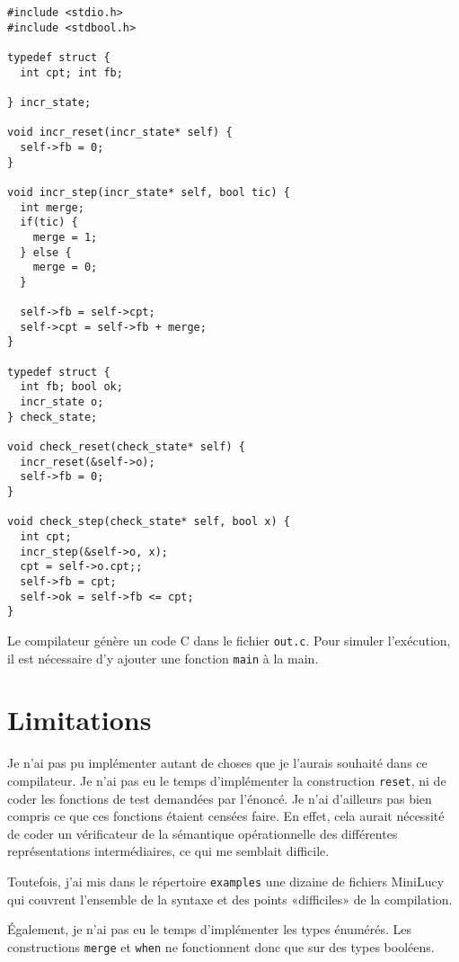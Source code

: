 \documentclass{article}
\begin{document}
\begin{verbatim}
#include <stdio.h>
#include <stdbool.h>

typedef struct {
  int cpt; int fb;

} incr_state;

void incr_reset(incr_state* self) {
  self->fb = 0;
}

void incr_step(incr_state* self, bool tic) {
  int merge;
  if(tic) {
    merge = 1;
  } else {
    merge = 0;
  }

  self->fb = self->cpt;
  self->cpt = self->fb + merge;
}

typedef struct {
  int fb; bool ok;
  incr_state o;
} check_state;

void check_reset(check_state* self) {
  incr_reset(&self->o);
  self->fb = 0;
}

void check_step(check_state* self, bool x) {
  int cpt;
  incr_step(&self->o, x);
  cpt = self->o.cpt;;
  self->fb = cpt;
  self->ok = self->fb <= cpt;
}
\end{verbatim}

Le compilateur génère un code C dans le fichier \verb/out.c/. Pour simuler
l'exécution, il est nécessaire d'y ajouter une fonction \verb/main/ à la main.

\section{Limitations}

Je n'ai pas pu implémenter autant de choses que je l'aurais souhaité dans ce
compilateur. Je n'ai pas eu le temps d'implémenter la construction \verb/reset/,
ni de coder les fonctions de test demandées par l'énoncé. Je n'ai d'ailleurs pas
bien compris ce que ces fonctions étaient censées faire. En effet, cela aurait
nécessité de coder un vérificateur de la sémantique opérationnelle des
différentes représentations intermédiaires, ce qui me semblait difficile.

Toutefois, j'ai mis dans le répertoire \verb/examples/ une dizaine de fichiers
MiniLucy qui couvrent l'ensemble de la syntaxe et des points «difficiles» de la
compilation.

Également, je n'ai pas eu le temps d'implémenter les types énumérés. Les
constructions \verb/merge/ et \verb/when/ ne fonctionnent donc que sur des types
booléens.
\end{document}
